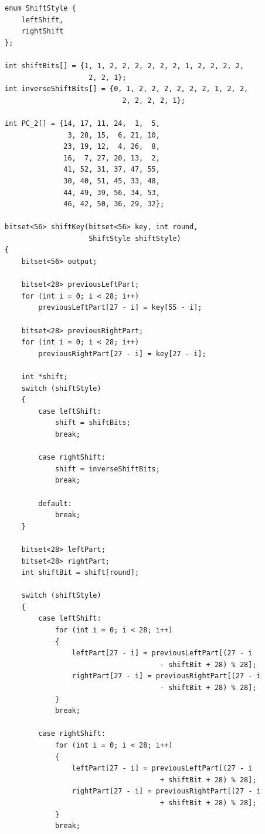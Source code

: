 \begin{prove}
\begin{verbatim}
enum ShiftStyle {
    leftShift,
    rightShift
};

int shiftBits[] = {1, 1, 2, 2, 2, 2, 2, 2, 1, 2, 2, 2, 2, 
                    2, 2, 1};
int inverseShiftBits[] = {0, 1, 2, 2, 2, 2, 2, 2, 1, 2, 2, 
                            2, 2, 2, 2, 1};

int PC_2[] = {14, 17, 11, 24,  1,  5,
               3, 28, 15,  6, 21, 10,
              23, 19, 12,  4, 26,  8,
              16,  7, 27, 20, 13,  2,
              41, 52, 31, 37, 47, 55,
              30, 40, 51, 45, 33, 48,
              44, 49, 39, 56, 34, 53,
              46, 42, 50, 36, 29, 32};

bitset<56> shiftKey(bitset<56> key, int round, 
                    ShiftStyle shiftStyle)
{
    bitset<56> output;

    bitset<28> previousLeftPart;
    for (int i = 0; i < 28; i++)
        previousLeftPart[27 - i] = key[55 - i];

    bitset<28> previousRightPart;
    for (int i = 0; i < 28; i++)
        previousRightPart[27 - i] = key[27 - i];

    int *shift;
    switch (shiftStyle)
    {
        case leftShift:
            shift = shiftBits;
            break;
            
        case rightShift:
            shift = inverseShiftBits;
            break;
            
        default:
            break;
    }
    
    bitset<28> leftPart;
    bitset<28> rightPart;
    int shiftBit = shift[round];

    switch (shiftStyle)
    {
        case leftShift:
            for (int i = 0; i < 28; i++)
            {
                leftPart[27 - i] = previousLeftPart[(27 - i
                                     - shiftBit + 28) % 28];
                rightPart[27 - i] = previousRightPart[(27 - i
                                     - shiftBit + 28) % 28];
            }
            break;
            
        case rightShift:
            for (int i = 0; i < 28; i++)
            {
                leftPart[27 - i] = previousLeftPart[(27 - i
                                     + shiftBit + 28) % 28];
                rightPart[27 - i] = previousRightPart[(27 - i
                                     + shiftBit + 28) % 28];
            }
            break;
            

\end{verbatim}
\end{prove}
